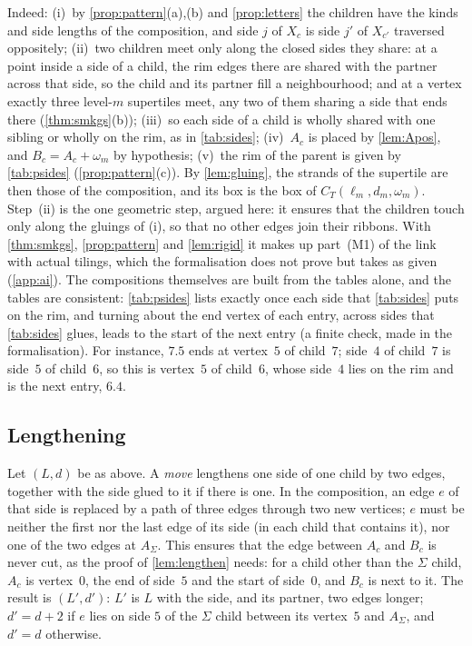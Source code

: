 \documentclass[11pt]{amsart}
\theoremstyle{definition}
\theoremstyle{remark}
\begin{document}
Indeed: (i)~by \cref{prop:pattern}(a),(b) and \cref{prop:letters} the children have the kinds and side lengths of the
composition, and side $j$ of $X_c$ is side $j'$ of $X_{c'}$ traversed oppositely; (ii)~two children meet only along the
closed sides they share: at a point inside a side of a child, the rim edges there are shared with the partner across
that side, so the child and its partner fill a neighbourhood; and at a vertex exactly three level-$m$ supertiles meet,
any two of them sharing a side that ends there (\cref{thm:smkgs}(b)); (iii)~so each side of a child is wholly shared
with one sibling or wholly on the rim, as in \cref{tab:sides}; (iv)~$A_c$ is placed by \cref{lem:Apos}, and
$B_c=A_c+\omega_m$ by hypothesis; (v)~the rim of the parent is given by \cref{tab:psides} (\cref{prop:pattern}(c)). By
\cref{lem:gluing}, the strands of the supertile are then those of the composition, and its box is the box of
$C_T(\ell_m,d_m,\omega_m)$. Step~(ii) is the one geometric step, argued here: it
ensures that the children touch only along the gluings of (i), so that no other edges join their ribbons. With
\cref{thm:smkgs}, \cref{prop:pattern} and \cref{lem:rigid} it makes up part~(M1) of the link with actual tilings, which the formalisation
does not prove but takes as given (\cref{app:ai}). The compositions themselves are built from the tables alone, and the
tables are consistent: \cref{tab:psides} lists exactly once each side that \cref{tab:sides} puts on the rim, and turning
about the end vertex of each entry, across sides that \cref{tab:sides} glues, leads to the start of the next entry (a
finite check, made in the formalisation). For instance, $7.5$ ends at vertex~$5$ of child~$7$; side~$4$ of child~$7$ is
side~$5$ of child~$6$, so this is vertex~$5$ of child~$6$, whose side~$4$ lies on the rim and is the next entry, $6.4$.

\subsection{Lengthening}\label{sec:lengthen}
Let $(L,d)$ be as above. A \emph{move} lengthens one side of one child by two edges, together with the side glued to it
if there is one. In the composition, an edge $e$ of that side is replaced by a path of three edges through two new
vertices; $e$ must be neither the first nor the last edge of its side (in each child that contains it), nor one of the
two edges at $A_\Sigma$. This ensures that the edge between $A_c$ and $B_c$ is never cut, as the proof of
\cref{lem:lengthen} needs: for a child other than the $\Sigma$ child, $A_c$ is vertex~$0$, the end of side~$5$ and the
start of side~$0$, and $B_c$ is next to it. The result is $(L',d')$: $L'$ is $L$ with the side,
and its partner, two edges longer; $d'=d+2$ if $e$ lies on side $5$ of the $\Sigma$ child between its vertex~$5$ and
$A_\Sigma$, and $d'=d$ otherwise.
\end{document}
